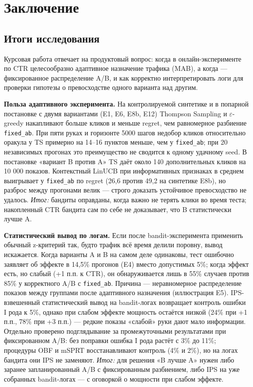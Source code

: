 \section{Заключение}

\subsection{Итоги исследования}\label{ux438ux442ux43eux433ux438-ux438ux441ux441ux43bux435ux434ux43eux432ux430ux43dux438ux44f}

Курсовая работа отвечает на продуктовый вопрос: когда в онлайн-эксперименте по CTR целесообразно адаптивное назначение трафика (MAB), а когда --- фиксированное распределение A/B, и как корректно интерпретировать логи для проверки гипотезы о превосходстве одного варианта над другим.

\textbf{Польза адаптивного эксперимента.} На контролируемой синтетике и в попарной постановке с двумя вариантами (E1, E6, E8b, E12) Thompson Sampling и $\varepsilon$-greedy накапливают больше кликов и меньше regret, чем равномерное разбиение \texttt{fixed\_ab}. При пяти руках и горизонте 5000 шагов недобор кликов относительно оракула у TS примерно на 14--16 пунктов меньше, чем у \texttt{fixed\_ab}; при 20 независимых прогонах это преимущество не сводится к одному удачному seed. В постановке «вариант B против A» TS даёт около 140 дополнительных кликов на 10 000 показов. Контекстный LinUCB при информативных признаках в среднем выигрывает у \texttt{fixed\_ab} по regret (26,6 против 49,2 на синтетике E8b), но разброс между прогонами велик --- строго доказать устойчивое превосходство не удалось. \emph{Итог:} бандиты оправданы, когда важно не терять клики во время теста; накопленный CTR бандита сам по себе не доказывает, что B статистически лучше A.

\textbf{Статистический вывод по логам.} Если после bandit-эксперимента применить обычный z-критерий так, будто трафик всё время делили поровну, вывод искажается. Когда варианты A и B на самом деле одинаковы, тест ошибочно заявляет об эффекте в 14,5\% прогонов (E4) вместо допустимых 5\%; когда эффект есть, но слабый (+1 п.п. к CTR), он обнаруживается лишь в 55\% случаев против 85\% у корректного A/B с \texttt{fixed\_ab}. Причина --- неравномерное распределение показов между группами после адаптивного назначения (иллюстрация E5). IPS-взвешенный статистический вывод на bandit-логах возвращает контроль ошибки I рода к 5\%, однако при слабом эффекте мощность остаётся низкой (24\% при +1 п.п., 78\% при +3 п.п.) --- редкие показы «слабой» руки дают мало информации. Отдельно проверено подглядывание за промежуточными результатами при фиксированном A/B: без поправки ошибка I рода растёт с 3\% до 11\%; процедуры OBF и mSPRT восстанавливают контроль (4\% и 2\%), но на логах бандита они IPS не заменяют. \emph{Итог:} для решения «B лучше A» нужен либо заранее запланированный A/B с фиксированным разбиением, либо IPS на уже собранных bandit-логах --- с оговоркой о мощности при слабом эффекте.

